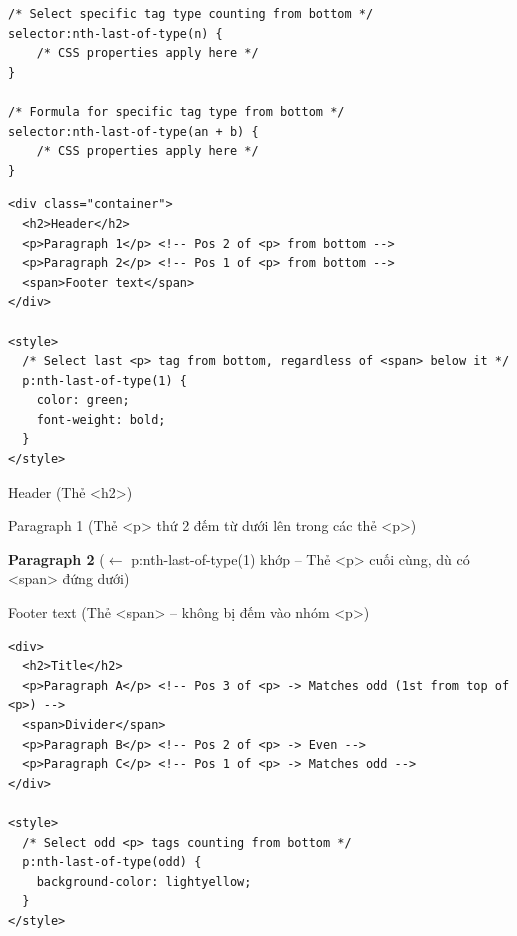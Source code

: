 \documentclass[11pt,oneside]{book}
\begin{document}
\begin{codeWindow}
\begin{lstlisting}[language=CSS3]
/* Select specific tag type counting from bottom */
selector:nth-last-of-type(n) {
    /* CSS properties apply here */
}

/* Formula for specific tag type from bottom */
selector:nth-last-of-type(an + b) {
    /* CSS properties apply here */
}
\end{lstlisting}
\end{codeWindow}

\begin{codeWindow}
\begin{lstlisting}[language=HTML5]
<div class="container">
  <h2>Header</h2>
  <p>Paragraph 1</p> <!-- Pos 2 of <p> from bottom -->
  <p>Paragraph 2</p> <!-- Pos 1 of <p> from bottom -->
  <span>Footer text</span>
</div>

<style>
  /* Select last <p> tag from bottom, regardless of <span> below it */
  p:nth-last-of-type(1) {
    color: green;
    font-weight: bold;
  }
</style>
\end{lstlisting}
\end{codeWindow}

\begin{browserWindow}
\sffamily\small
Header {\scriptsize\textcolor{gray!60}{(Thẻ <h2>)}} \par\vspace{2pt}
Paragraph 1 {\scriptsize\textcolor{gray!60}{(Thẻ <p> thứ 2 đếm từ dưới lên trong các thẻ <p>)}} \par\vspace{2pt}
\textcolor{green!70!black}{\textbf{Paragraph 2}} {\scriptsize\textcolor{gray!60}{($\leftarrow$ p:nth-last-of-type(1) khớp -- Thẻ <p> cuối cùng, dù có <span> đứng dưới)}} \par\vspace{2pt}
Footer text {\scriptsize\textcolor{gray!60}{(Thẻ <span> -- không bị đếm vào nhóm <p>)}}
\end{browserWindow}

\begin{codeWindow}
\begin{lstlisting}[language=HTML5]
<div>
  <h2>Title</h2>
  <p>Paragraph A</p> <!-- Pos 3 of <p> -> Matches odd (1st from top of <p>) -->
  <span>Divider</span>
  <p>Paragraph B</p> <!-- Pos 2 of <p> -> Even -->
  <p>Paragraph C</p> <!-- Pos 1 of <p> -> Matches odd -->
</div>

<style>
  /* Select odd <p> tags counting from bottom */
  p:nth-last-of-type(odd) {
    background-color: lightyellow;
  }
</style>
\end{lstlisting}
\end{codeWindow}
\end{document}
